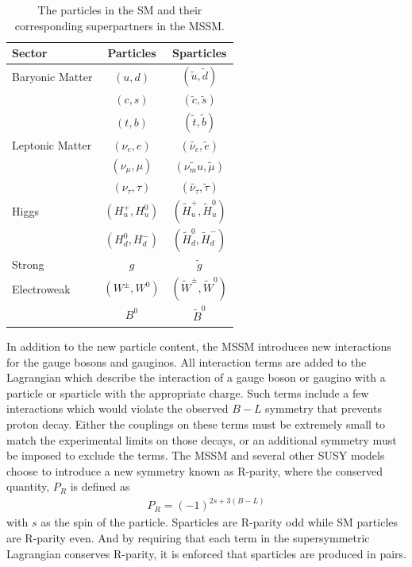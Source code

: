 \begin{table}
\centering
\begin{tabular}{lcc}
\hline
Sector & Particles & Sparticles \\
\hline
Baryonic Matter & $(u,d)$ & $(\tilde{u},\tilde{d})$ \\
                & $(c,s)$ & $(\tilde{c},\tilde{s})$ \\
                & $(t,b)$ & $(\tilde{t},\tilde{b})$ \\
Leptonic Matter & $(\nu_e,e)$ & $(\tilde{\nu_e},\tilde{e})$ \\
                & $(\nu_\mu,\mu)$ & $(\tilde{\nu_mu},\tilde{\mu})$ \\
                & $(\nu_\tau,\tau)$ & $(\tilde{\nu_\tau},\tilde{\tau})$ \\
Higgs           & $(H_u^+, H_u^0)$ & $(\tilde{H}_u^+, \tilde{H}_u^0)$ \\
                & $(H_d^0, H_d^-)$ & $(\tilde{H}_d^0, \tilde{H}_d^-)$ \\
Strong          & $g$ & $\tilde{g}$ \\
Electroweak     & $(W^\pm, W^0)$ & $(\tilde{W}^\pm, \tilde{W}^0)$ \\
                & $B^0$ & $\tilde{B}^0$ \\
\end{tabular}
\caption{The particles in the \acs*{SM} and their corresponding superpartners in the \acs*{MSSM}.}
\label{tab:sparticles}
\end{table}


In addition to the new particle content, the \ac{MSSM} introduces new interactions for the gauge bosons and gauginos.
All interaction terms are added to the Lagrangian which describe the interaction of a gauge boson or gaugino with a particle or sparticle with the appropriate charge.
Such terms include a few interactions which would violate the observed $B - L$ symmetry that prevents proton decay.
Either the couplings on these terms must be extremely small to match the experimental limits on those decays, or an additional symmetry must be imposed to exclude the terms.
The \ac{MSSM} and several other \ac{SUSY} models choose to introduce a new symmetry known as R-parity, where the conserved quantity, $P_R$ is defined as
\begin{align*}
P_R = (-1)^{2s + 3(B-L)}
\end{align*}
with $s$ as the spin of the particle.
Sparticles are R-parity odd while \ac{SM} particles are R-parity even.
And by requiring that each term in the supersymmetric Lagrangian conserves R-parity, it is enforced that sparticles are produced in pairs.


